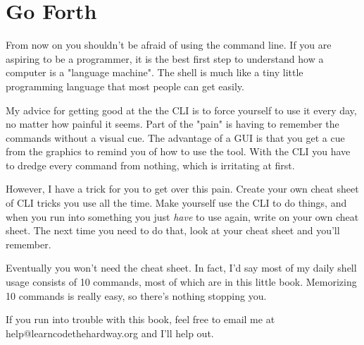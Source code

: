 \section{Go Forth}

From now on you shouldn't be afraid of using the command line.  If you are
aspiring to be a programmer, it is the best first step to understand how
a computer is a "language machine".  The shell is much like a tiny little
programming language that most people can get easily.

My advice for getting good at the the CLI is to force yourself to use it every
day, no matter how painful it seems.  Part of the "pain" is having to remember
the commands without a visual cue.  The advantage of a GUI is that you get a
cue from the graphics to remind you of how to use the tool.  With the CLI you
have to dredge every command from nothing, which is irritating at first.

However, I have a trick for you to get over this pain.  Create your own cheat
sheet of CLI tricks you use all the time.  Make yourself use the CLI to do
things, and when you run into something you just \emph{have} to use again, 
write on your own cheat sheet.  The next time you need to do that, look at
your cheat sheet and you'll remember.

Eventually you won't need the cheat sheet.  In fact, I'd say most of my
daily shell usage consists of 10 commands, most of which are in this little
book.  Memorizing 10 commands is really easy, so there's nothing stopping you.

If you run into trouble with this book, feel free to email me at 
help@learncodethehardway.org and I'll help out.
